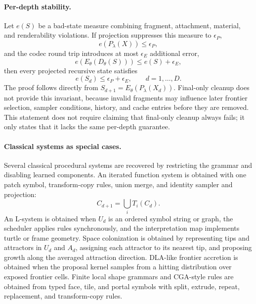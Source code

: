 \paragraph{Per-depth stability.}
Let \(e(S)\) be a bad-state measure combining fragment, attachment, material, and renderability violations. If projection suppresses this measure to \(\epsilon_P\),
\begin{equation}
e(P_\lambda(X))\leq \epsilon_P,
\end{equation}
and the codec round trip introduces at most \(\epsilon_E\) additional error,
\begin{equation}
e(E_\theta(D_\theta(S)))\leq e(S)+\epsilon_E,
\end{equation}
then every projected recursive state satisfies
\begin{equation}
e(S_d)\leq \epsilon_P+\epsilon_E,\qquad d=1,\ldots,D.
\end{equation}
The proof follows directly from \(S_{d+1}=E_\theta(P_\lambda(X_d))\). Final-only cleanup does not provide this invariant, because invalid fragments may influence later frontier selection, sampler conditions, history, and cache entries before they are removed. This statement does not require claiming that final-only cleanup always fails; it only states that it lacks the same per-depth guarantee.

\paragraph{Classical systems as special cases.}
Several classical procedural systems are recovered by restricting the grammar and disabling learned components. An iterated function system is obtained with one patch symbol, transform-copy rules, union merge, and identity sampler and projection:
\begin{equation}
C_{d+1}=\bigcup_i T_i(C_d).
\end{equation}
An L-system is obtained when \(U_d\) is an ordered symbol string or graph, the scheduler applies rules synchronously, and the interpretation map implements turtle or frame geometry. Space colonization is obtained by representing tips and attractors in \(U_d\) and \(A_d\), assigning each attractor to its nearest tip, and proposing growth along the averaged attraction direction. DLA-like frontier accretion is obtained when the proposal kernel samples from a hitting distribution over exposed frontier cells. Finite local shape grammars and CGA-style rules are obtained from typed face, tile, and portal symbols with split, extrude, repeat, replacement, and transform-copy rules.

